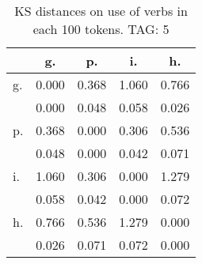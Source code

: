 \begin{table}[h!]
\begin{center}
\begin{tabular}{| l | c | c | c | c |}\hline
 & g. & p. & i. & h. \\\hline
g. & 0.000  & 0.368  & 1.060  & 0.766 \\\hline
 & 0.000  & 0.048  & 0.058  & 0.026 \\\hline
p. & 0.368  & 0.000  & 0.306  & 0.536 \\\hline
 & 0.048  & 0.000  & 0.042  & 0.071 \\\hline
i. & 1.060  & 0.306  & 0.000  & 1.279 \\\hline
 & 0.058  & 0.042  & 0.000  & 0.072 \\\hline
h. & 0.766  & 0.536  & 1.279  & 0.000 \\\hline
 & 0.026  & 0.071  & 0.072  & 0.000 \\\hline
\end{tabular}
\caption{KS distances on use of verbs in each 100 tokens. TAG: 5}
\end{center}
\end{table}
